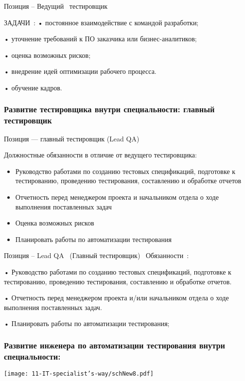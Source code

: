 \documentclass{../industrial-development}
\begin{document}
\lecturenotes

Позиция – Ведущий~\cite{hh} тестировщик~\cite{itcf}

ЗАДАЧИ~\cite{rab}:
•	постоянное взаимодействие с командой разработки;

•	уточнение требований к ПО заказчика или бизнес-аналитиков;

•	оценка возможных рисков;

•	внедрение идей оптимизации рабочего процесса.

•	обучение кадров.


\begin{frame} \frametitle{Развитие тестировщика внутри специальности: главный тестировщик}
 \begin{block}{}
  \alert{Позиция --- главный тестировщик (Lead QA)}

Должностные обязанности в отличие от ведущего тестировщика: 
  \end{block}
  \begin{itemize}
  \item Руководство работами по созданию тестовых спецификаций, подготовке к тестированию, проведению тестирования, составлению и обработке отчетов
  \item Отчетность перед менеджером проекта и начальником отдела о ходе выполнения поставленных задач
  \item Оценка возможных рисков
 \item Планировать работы по автоматизации тестирования
  \end{itemize}
\end{frame}

\lecturenotes

Позиция – Lead QA~\cite{hh} (Главный тестировщик)~\cite{itcf}
Обязанности~\cite{rab}:

•	Руководство работами по созданию тестовых спецификаций, подготовке к тестированию, проведению тестирования, составлению и обработке отчетов.

•	Отчетность перед менеджером проекта и/или начальником отдела о ходе выполнения поставленных задач.

•	Планировать работы по автоматизации тестирования;




\begin{frame} \frametitle{Развитие инженера по автоматизации тестирования внутри специальности: }
  \centerline{\texttt{[image: 11-IT-specialist's-way/schNew8.pdf]}}
\end{frame}
\end{document}
